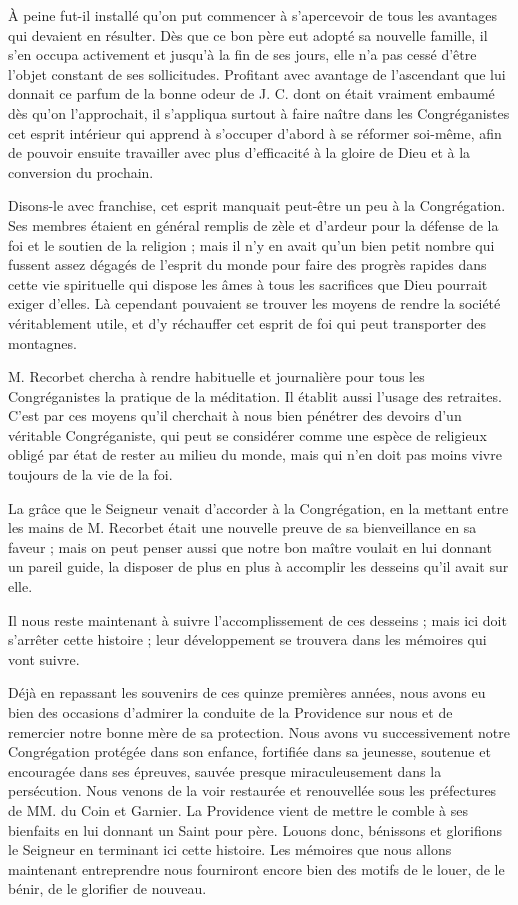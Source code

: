 À peine fut-il installé qu'on put commencer à s'apercevoir de tous les avantages qui devaient en résulter. Dès que ce bon père eut adopté sa nouvelle famille, il s'en occupa activement et jusqu'à la fin de ses jours, elle n'a pas cessé d'être l'objet constant de ses sollicitudes. Profitant avec avantage de l'ascendant que lui donnait ce parfum de la bonne odeur de J. C. dont on était vraiment embaumé dès qu'on l'approchait, il s'appliqua surtout à faire naître dans les Congréganistes cet esprit intérieur qui apprend à s'occuper d'abord à se réformer soi-même, afin de pouvoir ensuite travailler avec plus d'efficacité à la gloire de Dieu et à la conversion du prochain.

Disons-le avec franchise, cet esprit manquait peut-être un peu à la Congrégation. Ses membres étaient en général remplis de zèle et d'ardeur pour la défense de la foi et le soutien de la religion ; mais il n'y en avait qu'un bien petit nombre qui fussent assez dégagés de l'esprit du monde pour faire des progrès rapides dans cette vie spirituelle qui dispose les âmes à tous les sacrifices que Dieu pourrait exiger d'elles. Là cependant pouvaient se trouver les moyens de rendre la société véritablement utile, et d'y réchauffer cet esprit de foi qui peut transporter des montagnes.

M. Recorbet chercha à rendre habituelle et journalière pour tous les Congréganistes la pratique de la méditation. Il établit aussi l'usage des retraites. C'est par ces moyens qu'il cherchait à nous bien pénétrer des devoirs d'un véritable Congréganiste,
qui peut se considérer comme une espèce de religieux obligé par état de rester au milieu du monde, mais qui n'en doit pas moins vivre toujours de la vie de la foi.

La grâce que le Seigneur venait d'accorder à la Congrégation, en la mettant entre les mains de M. Recorbet était une nouvelle preuve de sa bienveillance en sa faveur ; mais on peut penser aussi que notre bon maître voulait en lui donnant un pareil guide, la disposer de plus en plus à accomplir les desseins qu'il avait sur elle.

Il nous reste maintenant à suivre l'accomplissement de ces desseins ; mais ici doit s'arrêter cette histoire ; leur développement se trouvera dans les mémoires qui vont suivre.

Déjà en repassant les souvenirs de ces quinze premières années, nous avons eu bien des occasions d'admirer la conduite de la Providence sur nous et de remercier notre bonne mère de sa protection. Nous avons vu successivement notre Congrégation protégée dans son enfance, fortifiée dans sa jeunesse, soutenue et encouragée dans ses épreuves, sauvée presque miraculeusement dans la persécution. Nous venons de la voir restaurée et renouvellée sous les préfectures de MM. du Coin et Garnier. La Providence vient de mettre le comble à ses bienfaits en lui donnant un Saint pour père. Louons donc, bénissons et glorifions le Seigneur en terminant ici cette histoire. Les mémoires que nous allons maintenant entreprendre nous fourniront encore bien des motifs de le louer, de le bénir, de le glorifier de nouveau.

